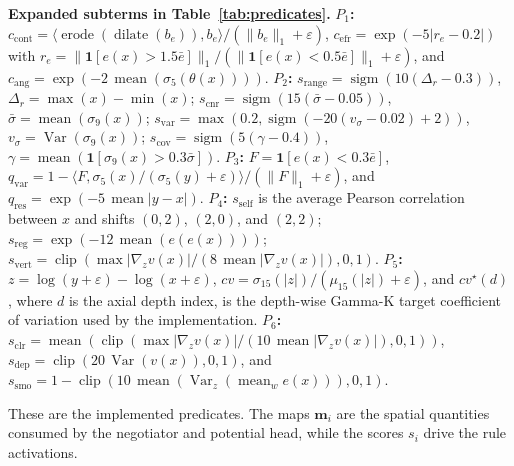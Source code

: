 \documentclass{ieeetj}
\begin{document}
{\footnotesize
\noindent\textbf{Expanded subterms in Table~\ref{tab:predicates}.}
\textbf{$P_1$:}
$c_{\text{cont}}=\langle\operatorname{erode}(\operatorname{dilate}(b_e)),b_e\rangle/(\|b_e\|_1+\varepsilon)$,
$c_{\text{efr}}=\exp(-5|r_e-0.2|)$ with
$r_e=\|\mathbf{1}[e(x)>1.5\bar e]\|_1/(\|\mathbf{1}[e(x)<0.5\bar e]\|_1+\varepsilon)$,
and $c_{\text{ang}}=\exp(-2\,\operatorname{mean}(\sigma_5(\theta(x))))$.
\textbf{$P_2$:}
$s_{\text{range}}=\operatorname{sigm}(10(\Delta_r-0.3))$, $\Delta_r=\max(x)-\min(x)$;
$s_{\text{cnr}}=\operatorname{sigm}(15(\bar\sigma-0.05))$, $\bar\sigma=\operatorname{mean}(\sigma_9(x))$;
$s_{\text{var}}=\max(0.2,\operatorname{sigm}(-20(v_\sigma-0.02)+2))$, $v_\sigma=\operatorname{Var}(\sigma_9(x))$;
$s_{\text{cov}}=\operatorname{sigm}(5(\gamma-0.4))$, $\gamma=\operatorname{mean}(\mathbf{1}[\sigma_9(x)>0.3\bar\sigma])$.
\textbf{$P_3$:}
$F=\mathbf{1}[e(x)<0.3\bar e]$,
$q_{\text{var}}=1-\langle F,\sigma_5(x)/(\sigma_5(y)+\varepsilon)\rangle/(\|F\|_1+\varepsilon)$,
and $q_{\text{res}}=\exp(-5\,\operatorname{mean}|y-x|)$.
\textbf{$P_4$:}
$s_{\text{self}}$ is the average Pearson correlation between $x$ and shifts $(0,2)$, $(2,0)$, and $(2,2)$;
$s_{\text{reg}}=\exp(-12\,\operatorname{mean}(e(e(x))))$;
$s_{\text{vert}}=\operatorname{clip}(\max |\nabla_z v(x)|/(8\,\operatorname{mean}|\nabla_z v(x)|),0,1)$.
\textbf{$P_5$:}
$z=\log(y+\varepsilon)-\log(x+\varepsilon)$,
$cv=\sigma_{15}(|z|)/(\mu_{15}(|z|)+\varepsilon)$,
and $cv^\star(d)$, where $d$ is the axial depth index, is the depth-wise Gamma-K target coefficient of variation used by the implementation.
\textbf{$P_6$:}
$s_{\text{clr}}=\operatorname{mean}(\operatorname{clip}(\max |\nabla_z v(x)|/(10\,\operatorname{mean}|\nabla_z v(x)|),0,1))$,
$s_{\text{dep}}=\operatorname{clip}(20\,\operatorname{Var}(v(x)),0,1)$,
and $s_{\text{smo}}=1-\operatorname{clip}(10\,\operatorname{mean}(\operatorname{Var}_z(\operatorname{mean}_w e(x))),0,1)$.

These are the implemented predicates. The maps $\mathbf{m}_i$ are the spatial quantities consumed by the negotiator and potential head, while the scores $s_i$ drive the rule activations.
}
\end{document}

